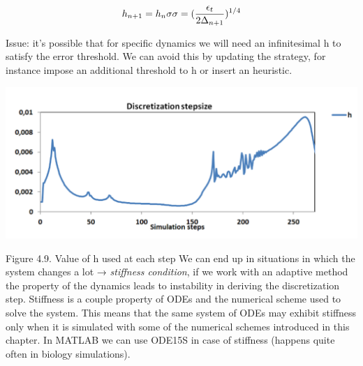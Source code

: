   $$h_{n+1}=h_n\sigma \\ \sigma =(\frac{\epsilon_t}{2\Delta_{n+1}})^{1/4}$$

  Issue: it's possible that for specific dynamics we will need an infinitesimal h to satisfy the error threshold.
  We can avoid this by updating the strategy, for instance impose an additional threshold to h or insert an heuristic.

  \includegraphics{discretization.png}

  Figure 4.9.
  Value of h used at each step We can end up in situations in which the system changes a lot → \emph{stiffness condition}, if we work with an adaptive method the property of the dynamics leads to instability in deriving the discretization step.
  Stiffness is a couple property of ODEs and the numerical scheme used to solve the system.
  This means that the same system of ODEs may exhibit stiffness only when it is simulated with some of the numerical schemes introduced in this chapter.
  In MATLAB we can use ODE15S in case of stiffness (happens quite often in biology simulations).
